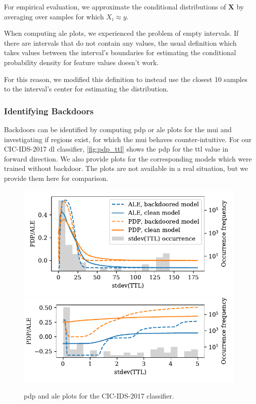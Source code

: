 \documentclass[10pt,sigconf,letterpaper,dvipsnames]{acmart}
\begin{document}
For empirical evaluation, we approximate the conditional distributions of $\boldsymbol X$ by averaging over samples for which $X_i \approx y$.

When computing \gls{ale} plots, we experienced the problem of empty intervals. If there are intervals  that do not contain any values, the usual definition which takes values between the interval's boundaries for estimating the conditional probability density for feature values doesn't work.

For this reason, we modified this definition to instead use the closest 10 samples to the interval's center for estimating the distribution.

\subsubsection{Identifying Backdoors}
Backdoors can be identified by computing \gls{pdp} or \gls{ale} plots for the \gls{mui} and investigating if regions exist, for which the \gls{mui} behaves counter-intuitive. For our CIC-IDS-2017 \gls{dl} classifier, \autoref{fig:pdp_ttl} shows the \gls{pdp} for the \gls{ttl} value in forward direction. We also provide plots for the corresponding models which were trained without backdoor. The plots are not available in a real situation, but we provide them here for comparison.

\begin{figure}[t]
\includegraphics[width=\columnwidth]{figures/pdpale2017nn.pdf}
\includegraphics[width=\columnwidth]{figures/pdpale2017nn_zoom.pdf}
\caption{\gls{pdp} and \gls{ale} plots for the CIC-IDS-2017 classifier.}
\label{fig:pdp_ttl}
\end{figure}
\end{document}
